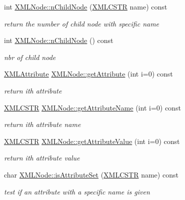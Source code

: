 \begin{DoxyCompactItemize}
int \hyperlink{group__navigate_ga8e52198f258167cd796dae21f1ffc352}{X\-M\-L\-Node\-::n\-Child\-Node} (\hyperlink{xmlParser_8h_acdb0d6fd8dd596384b438d86cfb2b182}{X\-M\-L\-C\-S\-T\-R} name) const 
\begin{DoxyCompactList}\small\item\em return the number of child node with specific name \end{DoxyCompactList}\item 
int \hyperlink{group__navigate_ga65aad0220b231b1bf5cd5c69d7c5de41}{X\-M\-L\-Node\-::n\-Child\-Node} () const 
\begin{DoxyCompactList}\small\item\em nbr of child node \end{DoxyCompactList}\item 
\hyperlink{structXMLAttribute}{X\-M\-L\-Attribute} \hyperlink{group__navigate_gaa07572a057ce7ffc8843e468d952f490}{X\-M\-L\-Node\-::get\-Attribute} (int i=0) const 
\begin{DoxyCompactList}\small\item\em return ith attribute \end{DoxyCompactList}\item 
\hyperlink{xmlParser_8h_acdb0d6fd8dd596384b438d86cfb2b182}{X\-M\-L\-C\-S\-T\-R} \hyperlink{group__navigate_ga67cf7717fa32175d8c6daa8f3f03ce7a}{X\-M\-L\-Node\-::get\-Attribute\-Name} (int i=0) const 
\begin{DoxyCompactList}\small\item\em return ith attribute name \end{DoxyCompactList}\item 
\hyperlink{xmlParser_8h_acdb0d6fd8dd596384b438d86cfb2b182}{X\-M\-L\-C\-S\-T\-R} \hyperlink{group__navigate_ga4abc0c5a3eec14e2f67518b625431541}{X\-M\-L\-Node\-::get\-Attribute\-Value} (int i=0) const 
\begin{DoxyCompactList}\small\item\em return ith attribute value \end{DoxyCompactList}\item 
char \hyperlink{group__navigate_ga8059888e8dd5d9caf04f765059c1b934}{X\-M\-L\-Node\-::is\-Attribute\-Set} (\hyperlink{xmlParser_8h_acdb0d6fd8dd596384b438d86cfb2b182}{X\-M\-L\-C\-S\-T\-R} name) const 
\begin{DoxyCompactList}\small\item\em test if an attribute with a specific name is given \end{DoxyCompactList}\item 

\end{DoxyCompactItemize}
